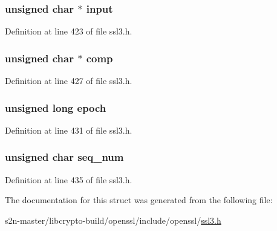 \subsubsection[{\texorpdfstring{input}{input}}]{\setlength{\rightskip}{0pt plus 5cm}unsigned char $\ast$ input}\hypertarget{structssl3__record__st_a97758498d08f9057ee49e80fcc634954}{}\label{structssl3__record__st_a97758498d08f9057ee49e80fcc634954}


Definition at line 423 of file ssl3.\+h.

\subsubsection[{\texorpdfstring{comp}{comp}}]{\setlength{\rightskip}{0pt plus 5cm}unsigned char $\ast$ comp}\hypertarget{structssl3__record__st_ade85d0d731495b9358cce85cd3fcef30}{}\label{structssl3__record__st_ade85d0d731495b9358cce85cd3fcef30}


Definition at line 427 of file ssl3.\+h.

\subsubsection[{\texorpdfstring{epoch}{epoch}}]{\setlength{\rightskip}{0pt plus 5cm}unsigned long epoch}\hypertarget{structssl3__record__st_aa9d2cadf47d8209c657a3e128a17bf44}{}\label{structssl3__record__st_aa9d2cadf47d8209c657a3e128a17bf44}


Definition at line 431 of file ssl3.\+h.

\subsubsection[{\texorpdfstring{seq\+\_\+num}{seq_num}}]{\setlength{\rightskip}{0pt plus 5cm}unsigned char seq\+\_\+num}\hypertarget{structssl3__record__st_ae44e46abeae23c5ff7dcdcc8d1db6d8a}{}\label{structssl3__record__st_ae44e46abeae23c5ff7dcdcc8d1db6d8a}


Definition at line 435 of file ssl3.\+h.



The documentation for this struct was generated from the following file\+:\begin{DoxyCompactItemize}
\item 
s2n-\/master/libcrypto-\/build/openssl/include/openssl/\hyperlink{include_2openssl_2ssl3_8h}{ssl3.\+h}\end{DoxyCompactItemize}
